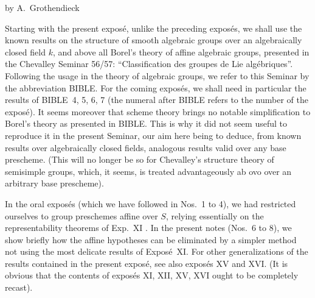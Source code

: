 \label{XII}
\begin{center}by A.~Grothendieck\end{center}
{\renewcommand{\thefootnote}{0}}
\setcounter{footnote}{0}

Starting with the present exposé, unlike the preceding exposés, we shall use the known results on the structure of smooth algebraic groups over an algebraically closed field $k$, and above all Borel's theory of affine algebraic groups, presented in the Chevalley Seminar 56/57: ``Classification des groupes de Lie algébriques''. Following the usage in the theory of algebraic groups, we refer to this Seminar by the abbreviation BIBLE. For the coming exposés, we shall need in particular the results of BIBLE~4, 5, 6, 7 (the numeral after BIBLE refers to the number of the exposé). It seems moreover that scheme theory brings no notable simplification to Borel's theory as presented in BIBLE. This is why it did not seem useful to reproduce it in the present Seminar, our aim here being to deduce, from known results over algebraically closed fields, analogous results valid over any base prescheme. (This will no longer be so for Chevalley's structure theory of semisimple groups, which, it seems, is treated advantageously ab ovo over an arbitrary base prescheme).

In the oral exposés (which we have followed in Nos.~1 to 4), we had restricted ourselves to group preschemes affine over $S$, relying essentially on the representability theorems of Exp.~XI . In the present notes (\cf Nos.~6 to 8), we show briefly how the affine hypotheses can be eliminated by a simpler method not using the most delicate results of Exposé~XI. For other generalizations of the results contained in the present exposé, see also exposés XV and XVI. (It is obvious that the contents of exposés XI, XII, XV, XVI ought to be completely recast).

